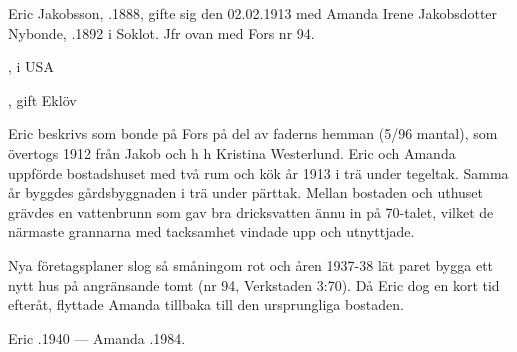 %
Eric Jakobsson, .1888, gifte sig den 02.02.1913 med Amanda Irene Jakobsdotter Nybonde, .1892 i Soklot. Jfr ovan med Fors nr 94.
\begin{jhchildren}
  \item {}, i USA
  \item {}
  \item {}, gift Eklöv
\end{jhchildren}

Eric beskrivs som bonde på Fors på del av faderns hemman (5/96 mantal), som övertogs 1912 från Jakob och h h Kristina Westerlund. Eric och Amanda uppförde bostadshuset med två rum och kök år 1913 i trä under tegeltak. Samma år byggdes gårdsbyggnaden i trä under pärttak. Mellan bostaden och uthuset grävdes en vattenbrunn som gav bra dricksvatten ännu in på 70-talet, vilket de närmaste grannarna med tacksamhet vindade upp och utnyttjade.

Nya företagsplaner slog så småningom rot och åren 1937-38 lät paret bygga ett nytt hus på angränsande tomt (nr 94, Verkstaden 3:70). Då Eric dog en kort tid efteråt, flyttade Amanda tillbaka till den ursprungliga bostaden.

Eric .1940  ---  Amanda .1984.


